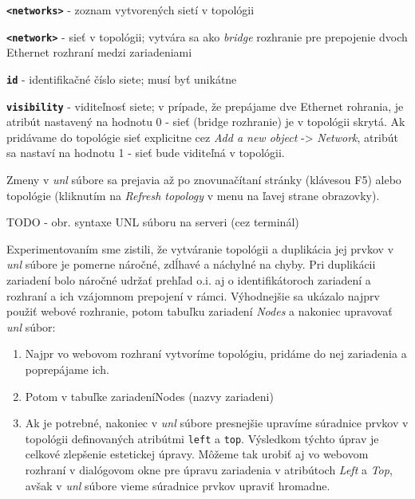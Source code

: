 \begin{enumerate}[noitemsep]
\begin{description}[noitemsep]
        \item \textbf{\texttt{<networks>}} - zoznam vytvorených sietí v topológii
        \begin{description}[noitemsep]
            \item \textbf{\texttt{<network>}} - sieť v topológii; vytvára sa ako \emph{bridge} rozhranie pre prepojenie dvoch Ethernet rozhraní medzi zariadeniami
            \begin{description}[noitemsep]
                \item \textbf{\texttt{id}} - identifikačné číslo siete; musí byť unikátne
                \item \textbf{\texttt{visibility}} - viditeľnosť siete; v prípade, že prepájame dve Ethernet rohrania, je atribút nastavený na hodnotu 0 - sieť (bridge rozhranie) je v topológii skrytá. Ak pridávame do topológie sieť explicitne cez \emph{Add a new object} -> \emph{Network}, atribút sa nastaví na hodnotu 1 - sieť bude viditeľná v topológii.
            \end{description}
        \end{description}
    \end{description}

Zmeny v \emph{unl} súbore sa prejavia až po znovunačítaní stránky (klávesou F5) alebo topológie (kliknutím na \emph{Refresh topology} v menu na ľavej strane obrazovky).

{\huge TODO - obr. syntaxe UNL súboru na serveri (cez terminál)}
    
    Experimentovaním sme zistili, že vytváranie topológii a duplikácia jej prvkov v \emph{unl} súbore je pomerne náročné, zdĺhavé a náchylné na chyby. Pri duplikácii zariadení bolo náročné udržať prehľad o.i. aj o identifikátoroch zariadení a rozhraní a ich vzájomnom prepojení v rámci. Výhodnejšie sa ukázalo najprv použiť webové rozhranie, potom tabuľku zariadení \emph{Nodes} a nakoniec upravovať \emph{unl} súbor:
    
    \begin{enumerate}[noitemsep]
        \item Najpr vo webovom rozhraní vytvoríme topológiu, pridáme do nej zariadenia a poprepájame ich.
        \item Potom v tabuľke zariadeníNodes (nazvy zariadeni)
        \item Ak je potrebné, nakoniec v \emph{unl} súbore presnejšie upravíme súradnice prvkov v topológii definovaných atribútmi \texttt{left} a \texttt{top}. Výsledkom týchto úprav je celkové zlepšenie estetickej úpravy. Môžeme tak urobiť aj vo webovom rozhraní v dialógovom okne pre úpravu zariadenia v atribútoch \emph{Left} a \emph{Top}, avšak v \emph{unl} súbore vieme súradnice prvkov upraviť hromadne.
    \end{enumerate}
    

\end{enumerate}
